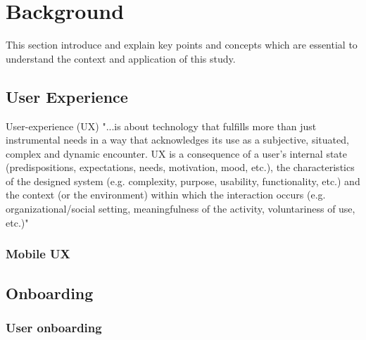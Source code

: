 \chapter{Background}
\label{chap:background}
This section introduce and explain key points and concepts which are essential to understand the context and application of this study.

\section{User Experience}
User-experience (UX) "...is about technology that fulfills more than just instrumental needs in a way that acknowledges its use as a subjective, situated, complex and dynamic encounter. UX is a consequence of a user’s internal state (predispositions, expectations, needs, motivation, mood, etc.), the characteristics of the designed system (e.g. complexity, purpose, usability, functionality, etc.) and the context (or the environment) within which the interaction occurs (e.g. organizational/social setting, meaningfulness of the activity, voluntariness of use, etc.)" \cite{Hassenzahl2006}

\subsection{Mobile UX}

\section{Onboarding}

\subsection{User onboarding}
